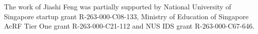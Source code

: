 \documentclass[journal]{IEEEtran}
\begin{document}
The work of Jiashi Feng was partially supported by National University of Singapore startup grant R-263-000-C08-133, Ministry of Education of Singapore AcRF Tier One grant R-263-000-C21-112 and NUS IDS grant R-263-000-C67-646.



%









\ifCLASSOPTIONcaptionsoff
  \newpage
\fi
\end{document}
